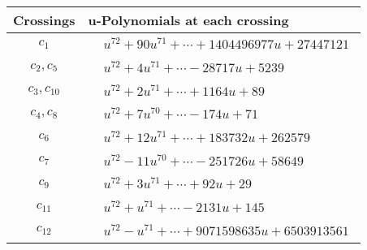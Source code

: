 \documentclass[1p]{elsarticle_modified}
\theoremstyle{definition}
\begin{document}
\begin{tabular}{m{50pt}|m{274pt}}
Crossings & \hspace{64pt}u-Polynomials at each crossing \\
\hline $$\begin{aligned}c_{1}\end{aligned}$$&$\begin{aligned}
&u^{72}+90 u^{71}+\cdots+1404496977 u+27447121
\end{aligned}$\\
\hline $$\begin{aligned}c_{2},c_{5}\end{aligned}$$&$\begin{aligned}
&u^{72}+4 u^{71}+\cdots-28717 u+5239
\end{aligned}$\\
\hline $$\begin{aligned}c_{3},c_{10}\end{aligned}$$&$\begin{aligned}
&u^{72}+2 u^{71}+\cdots+1164 u+89
\end{aligned}$\\
\hline $$\begin{aligned}c_{4},c_{8}\end{aligned}$$&$\begin{aligned}
&u^{72}+7 u^{70}+\cdots-174 u+71
\end{aligned}$\\
\hline $$\begin{aligned}c_{6}\end{aligned}$$&$\begin{aligned}
&u^{72}+12 u^{71}+\cdots+183732 u+262579
\end{aligned}$\\
\hline $$\begin{aligned}c_{7}\end{aligned}$$&$\begin{aligned}
&u^{72}-11 u^{70}+\cdots-251726 u+58649
\end{aligned}$\\
\hline $$\begin{aligned}c_{9}\end{aligned}$$&$\begin{aligned}
&u^{72}+3 u^{71}+\cdots+92 u+29
\end{aligned}$\\
\hline $$\begin{aligned}c_{11}\end{aligned}$$&$\begin{aligned}
&u^{72}+u^{71}+\cdots-2131 u+145
\end{aligned}$\\
\hline $$\begin{aligned}c_{12}\end{aligned}$$&$\begin{aligned}
&u^{72}- u^{71}+\cdots+9071598635 u+6503913561
\end{aligned}$\\
\hline
\end{tabular}\\~\\
\end{document}
